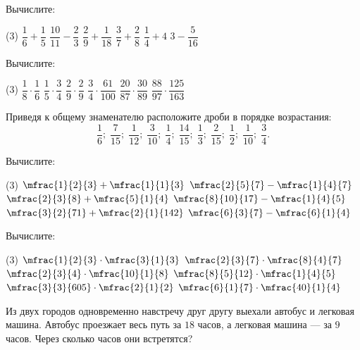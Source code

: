 \begin{homework}[number=2]
	\begin{listofex}
		\item Вычислите:
		\begin{tasks}(3)
			\task \( \dfrac{1}{6}+\dfrac{1}{5} \)
			\task \( \dfrac{10}{11}-\dfrac{2}{3} \)
			\task \( \dfrac{2}{9}+\dfrac{1}{18} \)
			\task \( \dfrac{3}{7}+\dfrac{2}{8} \)
			\task \( \dfrac{1}{4}+4 \)
			\task \( 3-\dfrac{5}{16} \)
		\end{tasks}
		\item Вычислите:
		\begin{tasks}(3)
			\task \( \dfrac{1}{8}\cdot\dfrac{1}{6} \)
			\task \( \dfrac{1}{5}\cdot\dfrac{3}{4} \)
			\task \( \dfrac{2}{9}\cdot\dfrac{2}{9} \)
			\task \( \dfrac{3}{4}\cdot\dfrac{61}{100} \)
			\task \( \dfrac{20}{87}\cdot\dfrac{30}{89} \)
			\task \( \dfrac{88}{97}\cdot\dfrac{125}{163} \)
		\end{tasks}
		\item Приведя к общему знаменателю расположите дроби в порядке возрастания:
		\[ \dfrac{1}{6};\;\dfrac{7}{15};\;\dfrac{1}{12};\;\dfrac{3}{10};\;\dfrac{1}{4};\;\dfrac{14}{15};\;\dfrac{1}{3};\;\dfrac{2}{15};\;\dfrac{1}{2};\;\dfrac{1}{10};\;\dfrac{3}{4}. \]
		\item Вычислите:
		\begin{tasks}(3)
			\task \(\mfrac{1}{2}{3}+\mfrac{1}{1}{3} \)
			\task \(\mfrac{2}{5}{7}-\mfrac{1}{4}{7} \)
			\task \( \mfrac{2}{3}{8}+\mfrac{5}{1}{4}\)
			\task \( \mfrac{8}{10}{17}-\mfrac{1}{4}{5}\)
			\task \( \mfrac{3}{2}{71}+\mfrac{2}{1}{142} \)
			\task \( \mfrac{6}{3}{7}-\mfrac{6}{1}{4}\)
		\end{tasks}
		\item Вычислите:
		\begin{tasks}(3)
			\task \(\mfrac{1}{2}{3}\cdot\mfrac{3}{1}{3} \)
			\task \(\mfrac{2}{3}{7}\cdot\mfrac{8}{4}{7} \)
			\task \( \mfrac{2}{3}{4}\cdot\mfrac{10}{1}{8}\)
			\task \( \mfrac{8}{5}{12}\cdot\mfrac{1}{4}{5}\)
			\task \( \mfrac{3}{3}{605}\cdot\mfrac{2}{1}{2} \)
			\task \( \mfrac{6}{1}{7}\cdot\mfrac{40}{1}{4}\)
		\end{tasks}
	\item Из двух городов одновременно навстречу друг другу выехали автобус и легковая
	машина. Автобус проезжает весь путь за \( 18 \) часов, а легковая машина --- за \( 9 \) часов. Через сколько часов они встретятся?
	\end{listofex}
\end{homework}

